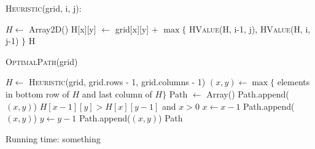 \documentclass[12pt,letterpaper]{article}
\begin{document}
\textsc{Heuristic}(grid, i, j):
\begin{algorithmic}
\State $H \gets$ Array2D()
		\State H[x][y] $\gets$ grid[x][y] + $\max \{$ \textsc{HValue}(H, i-1, j), \textsc{HValue}(H, i, j-1)  $\}$
	\EndFor
\EndFor
\State \Return H
\end{algorithmic}

\newpage

\textsc{OptimalPath}(grid)
\begin{algorithmic}
\State $H \gets$ \textsc{Heuristic}(grid, grid.rows - 1, grid.columns - 1)
\State $(x, y) \gets \max \{ $ elements in bottom row of $H$ and last column of $H \}$
\State Path $\gets$ Array()
\State Path.append($(x, y)$)
	\If $H[x-1][y] > H[x][y-1]$ and $x > 0$
		\State $x \gets x - 1$
		\State Path.append($(x, y)$)
	\Else
		\State $y \gets y - 1$
		\State Path.append($(x, y)$)
	\EndIf 
\EndWhile
\State \Return Path
\end{algorithmic}

Running time: something
\end{document}
